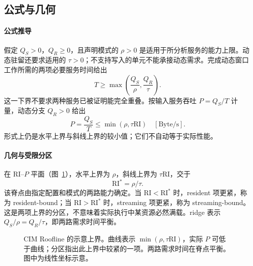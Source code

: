 \documentclass[11pt, a4paper]{ctexart}
\theoremstyle{definition}
\newcommand{\RI}{\mathrm{RI}}
\begin{document}
\subsection{公式与几何}
\label{sec:cim_formula}

\paragraph{公式推导}
假定 $Q_S>0$，$Q_R\ge0$，且声明模式的 $\rho>0$ 是适用于所分析服务的能力上限。动态驻留还要求适用的 $\tau>0$；不支持写入的单元不能承接动态需求。完成动态窗口工作所需的两项必要服务时间给出
\begin{equation}
T\ge\max\!\left(\frac{Q_S}{\rho},\frac{Q_R}{\tau}\right).
\label{eq:cim_time_bound}
\end{equation}
这一下界不要求两种服务已被证明能完全重叠。按输入服务吞吐 $P=Q_S/T$ 计量，动态分支 $Q_R>0$ 给出
\begin{equation}
\boxed{P=\frac{Q_S}{T}\le\min(\rho,\tau\RI)\quad[\mathrm{Byte}/\mathrm{s}].}
\label{eq:cim_roofline}
\end{equation}
形式上仍是水平上界与斜线上界的较小值；它们不自动等于实际性能。

\paragraph{几何与受限分区}
在 $\RI$--$P$ 平面（图~\ref{fig:cim_roofline}），水平上界为 $\rho$，斜线上界为 $\tau\RI$，交于
\[
\RI^*=\rho/\tau.
\]
该脊点由指定配置和模式的两路能力确定。当 $\RI<\RI^*$ 时，resident 项更紧，称为 resident-bound；当 $\RI>\RI^*$ 时，streaming 项更紧，称为 streaming-bound。这是两项上界的分区，不意味着实际执行中某资源必然满载。ridge 表示 $Q_S/\rho=Q_R/\tau$，即两路需求时间平衡。

\begin{figure}[htbp]
\centering
{}
\caption{CIM Roofline 的示意上界。曲线表示 $\min(\rho,\tau\RI)$，实际 $P$ 可低于曲线；分区指出此上界中较紧的一项。两路需求时间在脊点平衡。图中为线性坐标示意。}
\label{fig:cim_roofline}
\end{figure}
\end{document}
